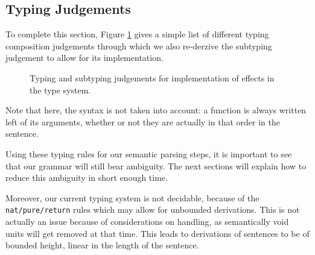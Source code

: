 \subsection{Typing Judgements}\label{subsec:judgements}
To complete this section, Figure \ref{tab:judgements} gives a simple list of different typing composition judgements through which we also re-derzive the subtyping judgement to allow for its implementation.
\begin{figure}
	
	\caption{Typing and subtyping judgements for implementation of effects in the
		type system.}
	\label{tab:judgements}
\end{figure}
Note that here, the syntax is not taken into account: a function is always written left of its arguments, whether or not they are actually in that order in the sentence.

\smallskip

Using these typing rules for our semantic parsing steps, it is important to
see that our grammar will still bear ambiguity.
The next sections will explain how to reduce this ambiguity in short enough
time.

Moreover, our current typing system is not decidable, because of the
\texttt{nat/pure/return} rules which may allow for unbounded derivations.
This is not actually an issue because of considerations on handling, as
semantically void units will get removed at that time.
This leads to derivations of sentences to be of bounded height, linear in the
length of the sentence.
